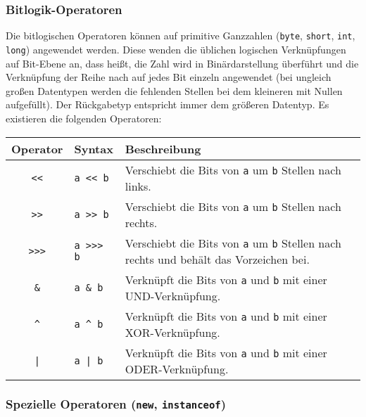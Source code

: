 	\subsubsection{Bitlogik-Operatoren}
		Die bitlogischen Operatoren können auf primitive Ganzzahlen (\lstinline|byte|, \lstinline|short|, \lstinline|int|, \lstinline|long|) angewendet werden. Diese wenden die üblichen logischen Verknüpfungen auf Bit-Ebene an, dass heißt, die Zahl wird in Binärdarstellung überführt und die Verknüpfung der Reihe nach auf jedes Bit einzeln angewendet (bei ungleich großen Datentypen werden die fehlenden Stellen bei dem kleineren mit Nullen aufgefüllt). Der Rückgabetyp entspricht immer dem größeren Datentyp. Es existieren die folgenden Operatoren:
		\begin{table}[H]
			\centering
			\begin{tabular}{c | l | l}
				\textbf{Operator} & \textbf{Syntax}      & \textbf{Beschreibung}                                                                               \\ \hline
				  \texttt{<{}<}   & \texttt{a <{}< b}    & Verschiebt die Bits von \texttt{a} um \texttt{b} Stellen nach links.                                \\
				  \texttt{>{}>}   & \texttt{a >{}> b}    & Verschiebt die Bits von \texttt{a} um \texttt{b} Stellen nach rechts.                               \\
				\texttt{>{}>{}>}  & \texttt{a >{}>{}> b} & Verschiebt die Bits von \texttt{a} um \texttt{b} Stellen nach rechts und behält das Vorzeichen bei. \\
				   \texttt{\&}    & \texttt{a \& b}      & Verknüpft die Bits von \texttt{a} und \texttt{b} mit einer UND-Verknüpfung.                         \\
				   \texttt{\^}    & \texttt{a \^{} b}    & Verknüpft die Bits von \texttt{a} und \texttt{b} mit einer XOR-Verknüpfung.                         \\
				   \texttt{|}     & \texttt{a | b}       & Verknüpft die Bits von \texttt{a} und \texttt{b} mit einer ODER-Verknüpfung.
			\end{tabular}
		\end{table}
	
	\subsubsection{Spezielle Operatoren (\texttt{new}, \texttt{instanceof})}
	
